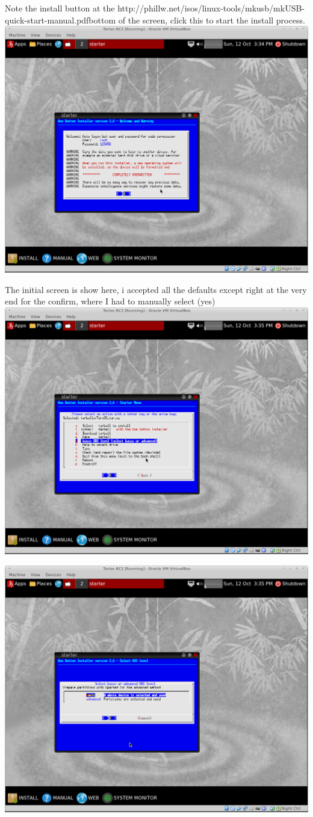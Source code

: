 \documentclass[12pt,a4paper]{book}
\begin{document}
Note the install button at the http://phillw.net/isos/linux-tools/mkusb/mkUSB-quick-start-manual.pdfbottom of the screen,  click this to start the install process. \\
\includegraphics[width=0.7\linewidth]{torios-rc2-install1}

The initial screen is show here,  i accepted all the defaults except right at the very end for the confirm, where I had to manually select (yes) \\

\includegraphics[width=0.7\linewidth]{torios-rc2-install2}

\includegraphics[width=0.7\linewidth]{torios-rc2-install3}
\end{document}
